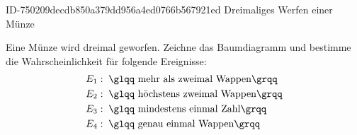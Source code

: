 \begin{exercise}
      {ID-750209decdb850a379dd956a4ed0766b567921ed}
      {Dreimaliges Werfen einer Münze}
  \ifproblem\problem\par
    Eine Münze wird dreimal geworfen. Zeichne das Baumdiagramm und bestimme
    die Wahrscheinlichkeit für folgende Ereignisse:
    \begin{equation*}
      \begin{split}
        E_1&:\;\text{\glqq mehr als zweimal Wappen\grqq} \\
        E_2&:\;\text{\glqq höchstens zweimal Wappen\grqq} \\
        E_3&:\;\text{\glqq mindestens einmal Zahl\grqq} \\
        E_4&:\;\text{\glqq genau einmal Wappen\grqq}
      \end{split}
    \end{equation*}
  \fi
  \ifoutcome\outcome
    \begin{center}
\end{center}
\end{exercise}
